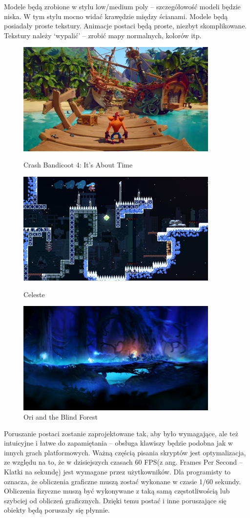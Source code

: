\documentclass[12pt,twoside]{article}
\begin{document}
Modele będą zrobione w stylu low/medium poly -- szczegółowość modeli będzie
niska. W tym stylu mocno widać krawędzie między ścianami. Modele będą posiadały
proste tekstury. Animacje postaci będą proste, niezbyt
skomplikowane. Tekstury należy `wypalić' -- zrobić mapy normalnych, kolorów itp. 
\begin{figure}[hb]
	\centering
	\includegraphics[width=10cm]{GamePictures/Crash.jpg}
	\caption{Crash Bandicoot 4: It’s About Time}\label{Pict:Crash}

	\centering
	\includegraphics[width=10cm]{GamePictures/Celeste.jpg}
	\caption{Celeste}\label{Pict:Celeste}
	\centering
	\includegraphics[width=10cm]{GamePictures/Ori.jpg}
	\caption{Ori and the Blind Forest}\label{Pict:Ori}

\end{figure}

Poruszanie postaci zostanie zaprojektowane tak, aby było wymagające, ale też
intuicyjne i łatwe do zapamiętania -- obsługa klawiszy będzie podobna jak w innych
grach platformowych. Ważną częścią pisania skryptów jest optymalizacja, ze
względu na to, że w dzisiejszych czasach 60 FPS(z ang. Frames Per Second –
Klatki na sekundę) jest wymagane przez użytkowników. Dla programisty to oznacza,
że obliczenia graficzne muszą zostać wykonane w czasie 1/60 sekundy. Obliczenia
fizyczne muszą być wykonywane z taką samą częstotliwością lub szybciej od
obliczeń graficznych. Dzięki temu postać i inne poruszające się obiekty będą
poruszały się płynnie.
\end{document}
